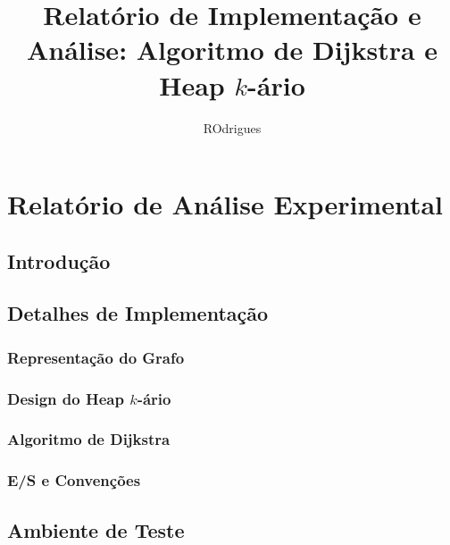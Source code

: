 \documentclass{infufrgs}
\title{Relatório de Implementação e Análise: Algoritmo de Dijkstra e Heap $k$-ário}
\author{ROdrigues}{Juliana}
\begin{document}
\maketitle

\chapter{Relatório de Análise Experimental}

\section{Introdução}

\section{Detalhes de Implementação}

\subsection{Representação do Grafo}

\subsection{Design do Heap $k$-ário}

\subsection{Algoritmo de Dijkstra}

\subsection{E/S e Convenções}

\section{Ambiente de Teste}
\end{document}
